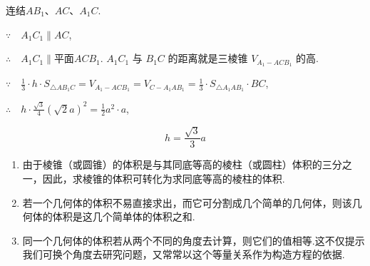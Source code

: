 \begin{solution}
    连结$AB_{1}$、$AC$、$A_{1}C$.

$\because\quad A_{1}C_{1}\parallel AC$,

$\therefore\quad A_{1}C_{1}\parallel \text{平面} ACB_{1}$. $A_{1}C_{1}$ 与 $B_{1}C$ 的距离就是三棱锥 $V_{A_{1}-ACB_{1}}$ 的高.

$\because\quad \frac{1}{3}\cdot  h\cdot  S_{\triangle AB_{1}C}=V_{A_{1}-ACB_{1}}=V_{C-A_{1}AB_{1}}=\frac{1}{3}\cdot S_{\triangle A_{1}AB_{1}}\cdot BC$,

$\therefore\quad h\cdot\frac{\sqrt{3}}{4}\left(\sqrt{2}a\right)^{2}=\frac{1}{2}a^{2}\cdot a$,

\[h=\frac{\sqrt{3}}{3}a\]
\end{solution}

\begin{remark}
\begin{enumerate}
    \item  由于棱锥（或圆锥）的体积是与其同底等高的棱柱（或圆柱）体积的三分之一，因此，求棱锥的体积可转化为求同底等高的棱柱的体积.

    \item  若一个几何体的体积不易直接求出，而它可分割成几个简单的几何体，则该几何体的体积是这几个简单体的体积之和.

    \item 同一个几何体的体积若从两个不同的角度去计算，则它们的值相等.这不仅提示我们可换个角度去研究问题，又常常以这个等量关系作为构造方程的依据.
\end{enumerate}
\end{remark}

